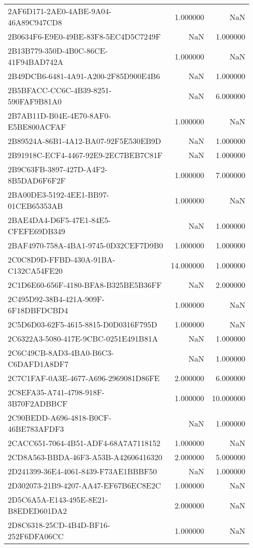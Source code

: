 \begin{tabular}{lrr}
2AF6D171-2AE0-4ABE-9A04-46A89C947CD8 & 1.000000 & NaN \\
2B0634F6-E9E0-49BE-83F8-5EC4D5C7249F & NaN & 1.000000 \\
2B13B779-350D-4B0C-86CE-41F94BAD742A & 1.000000 & NaN \\
2B49DCB6-6481-4A91-A200-2F85D900E4B6 & NaN & 1.000000 \\
2B5BFACC-CC6C-4B39-8251-590FAF9B81A0 & NaN & 6.000000 \\
2B7AB11D-B04E-4E70-8AF0-E5BE800ACFAF & 1.000000 & NaN \\
2B89524A-86B1-4A12-BA07-92F5E530EB9D & NaN & 1.000000 \\
2B91918C-ECF4-4467-92E9-2EC7BEB7C81F & NaN & 1.000000 \\
2B9C63FB-3897-427D-A4F2-8B5DAD6F6F2F & 1.000000 & 7.000000 \\
2BA00DE3-5192-4EE1-BB97-01CEB65353AB & 1.000000 & NaN \\
2BAE4DA4-D6F5-47E1-84E5-CFEFE69DB349 & NaN & 1.000000 \\
2BAF4970-758A-4BA1-9745-0D32CEF7D9B0 & 1.000000 & 1.000000 \\
2C0C8D9D-FFBD-430A-91BA-C132CA54FE20 & 14.000000 & 1.000000 \\
2C1D6E60-656F-4180-BFA8-B325BE5B36FF & NaN & 2.000000 \\
2C495D92-38B4-421A-909F-6F18DBFDCBD4 & 1.000000 & NaN \\
2C5D6D03-62F5-4615-8815-D0D0316F795D & 1.000000 & NaN \\
2C6322A3-5080-417E-9CBC-0251E491B81A & NaN & 1.000000 \\
2C6C49CB-8AD3-4BA0-B6C3-C6DAFD1A8DF7 & NaN & 1.000000 \\
2C7C1FAF-0A3E-4677-A696-2969081D86FE & 2.000000 & 6.000000 \\
2C8EFA35-A741-4798-918F-3B70F2ADBBCF & 1.000000 & 10.000000 \\
2C90BEDD-A696-4818-B0CF-46BE783AFDF3 & NaN & 1.000000 \\
2CACC651-7064-4B51-ADF4-68A7A7118152 & 1.000000 & NaN \\
2CD8A563-BBDA-46F3-A53B-A42606416320 & 2.000000 & 5.000000 \\
2D241399-36E4-4061-8439-F73AE1BBBF50 & NaN & 1.000000 \\
2D302073-21B9-4207-AA47-EF67B6EC8E2C & 1.000000 & NaN \\
2D5C6A5A-E143-495E-8E21-B8EDED601DA2 & 2.000000 & NaN \\
2D8C6318-25CD-4B4D-BF16-252F6DFA06CC & 1.000000 & NaN \\

\end{tabular}
